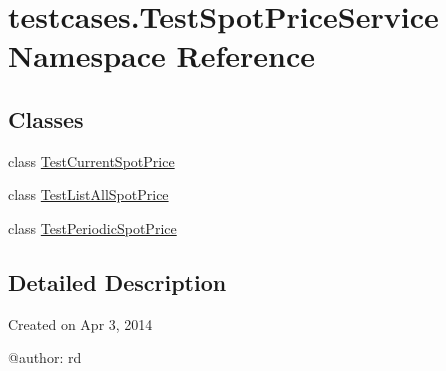 \hypertarget{namespacetestcases_1_1TestSpotPriceService}{\section{testcases.\-Test\-Spot\-Price\-Service Namespace Reference}
\label{namespacetestcases_1_1TestSpotPriceService}
}
\subsection*{Classes}
\begin{DoxyCompactItemize}
\item 
class \hyperlink{classtestcases_1_1TestSpotPriceService_1_1TestCurrentSpotPrice}{Test\-Current\-Spot\-Price}
\item 
class \hyperlink{classtestcases_1_1TestSpotPriceService_1_1TestListAllSpotPrice}{Test\-List\-All\-Spot\-Price}
\item 
class \hyperlink{classtestcases_1_1TestSpotPriceService_1_1TestPeriodicSpotPrice}{Test\-Periodic\-Spot\-Price}
\end{DoxyCompactItemize}


\subsection{Detailed Description}
\begin{DoxyVerb}Created on Apr 3, 2014

@author: rd
\end{DoxyVerb}
 